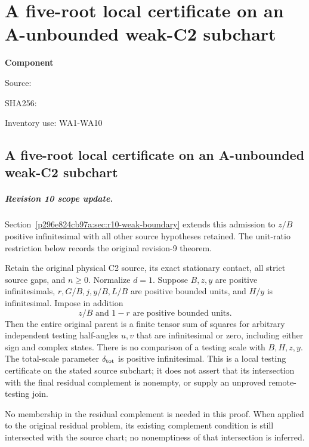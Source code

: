 \chapter{A five-root local certificate on an A-unbounded weak-C2 subchart}
\label{component:p97700cec8dc8}
\noindent\textbf{Component }\par
{\small\noindent Source: \par}
{\small\noindent SHA256: \par}
{\small\noindent Inventory use: WA1-WA10\par}
\medskip
\section{A five-root local certificate on an A-unbounded weak-C2 subchart}
\label{p97700cec8dc8:sec:r9-weak-A-five-root}

\paragraph{Revision 10 scope update.}
Section~\ref{p296e824cb97a:sec:r10-weak-boundary} extends this admission to $z/B$
positive infinitesimal with all other source hypotheses retained.
The unit-ratio restriction below records the original revision-9 theorem.

\begin{theorem}
Retain the original physical C2 source, its exact stationary contact,
all strict source gaps, and $n\ge0$.
Normalize $d=1$. Suppose $B,z,y$ are positive infinitesimals,
$r,G/B,j,y/B,L/B$ are positive bounded units, and $H/y$ is
infinitesimal. Impose in addition
\[
 z/B\text{ and }1-r\text{ are positive bounded units}.       \tag{WA1}
\]
Then the entire original parent is a finite tensor sum of squares
for arbitrary independent testing half-angles $u,v$ that are
infinitesimal or zero, including either sign and complex states.
There is no comparison of a testing scale with $B,H,z,y$.
The total-scale parameter $\delta_{\rm tot}$ is positive infinitesimal.
This is a local testing certificate on the stated source subchart;
it does not assert that its intersection with the final residual
complement is nonempty, or supply an unproved remote-testing join.
\end{theorem}

No membership in the residual complement is needed in this proof.
When applied to the original residual problem, its existing complement
condition is still intersected with the source chart; no nonemptiness
of that intersection is inferred.

